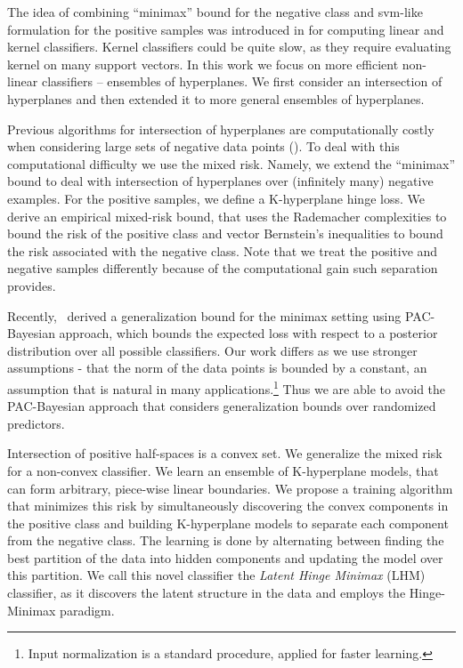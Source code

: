 \documentclass[twoside,11pt]{article}
\begin{document}
The idea of combining ``minimax'' bound for the negative class and svm-like formulation for the positive samples was introduced in \cite{OsadchyKF12,OsadchyKR16} for computing linear and kernel classifiers. Kernel classifiers could be quite slow, as they require evaluating kernel on many support vectors.  In this work we focus on more efficient non-linear classifiers -- ensembles of hyperplanes. We first consider an intersection of hyperplanes and then extended it to more general ensembles of hyperplanes.


Previous algorithms for intersection of hyperplanes are computationally costly when considering large sets of negative data points (\cite{Klivans09,DanielyLS14}). To deal with this computational difficulty we use the mixed risk. Namely, we extend the ``minimax'' bound to deal with intersection of hyperplanes over (infinitely many) negative examples. %
For the positive samples, we define a K-hyperplane hinge loss. We derive an empirical mixed-risk bound, that uses the Rademacher complexities to bound the risk of the positive class and vector Bernstein's inequalities to bound the risk associated with the negative class. Note that we treat the positive and negative samples differently because of the computational gain such separation provides.

Recently,~\cite{Honorio14} derived a generalization bound for the minimax setting using PAC-Bayesian approach, which bounds the expected loss with respect to a posterior distribution over all possible classifiers. Our work differs as we use stronger assumptions - that the norm of the data points is bounded by a constant, an assumption that is natural in many applications.\footnote{Input normalization is a standard procedure, applied for faster learning.} Thus we are able to avoid the PAC-Bayesian approach that considers generalization bounds over randomized predictors. %


Intersection of positive half-spaces is a convex set. We generalize the mixed risk for a non-convex classifier.  We learn an ensemble of K-hyperplane models, that can form arbitrary, piece-wise linear boundaries. We propose a training algorithm that minimizes this risk by simultaneously discovering the convex components in the positive class and building K-hyperplane models to separate each component from the negative class. The learning is done by alternating between finding the best partition of the data into hidden components and updating the model over this partition. We call this novel classifier the \emph{Latent Hinge Minimax} (LHM) classifier, as it discovers the latent structure in the data and employs the Hinge-Minimax paradigm.
\end{document}
